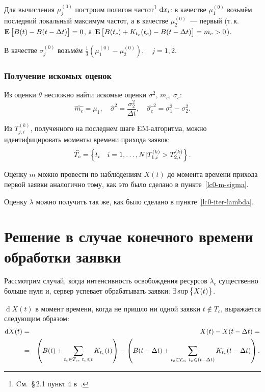 \documentclass[a4paper,10pt]{article}
\begin{document}
Для вычисления $\mu_j^{(0)}$ построим полигон частот\footnote{%
Cм.~\S\,2.1 пункт 4 в~\cite{ivchmed2010matstat}.
} $\dif x_i$:
в качестве $\mu_1^{(0)}$ возьмём последний локальный максимум частот, 
а в качестве $\mu_2^{(0)}$~--- первый
(т.\,к.~$\mathbf{E}\sbr{B(t) - B(t - \Delta t)} = 0$, 
а $\mathbf{E}\sbr{B(t_c) + K_{t_c}(t_c) - B(t - \Delta t)} = m_c > 0$).

В качестве $\sigma_j^{(0)}$ возьмём $\frac{1}{3}(\mu_1^{(0)} - \mu_2^{(0)}), 
\quad j=1, 2$.

\subsubsection{Получение искомых оценок}
Из оценки $\theta$ несложно найти искомые оценки 
$\sigma^2$, $m_c$, $\sigma_c$:
$$
  \widehat{m_c} = \mu_1, \quad 
  \widehat{\sigma}^2 = \frac{\sigma_2^2}{\Delta t}, \quad
  \widehat{\sigma_c}^2 = \sigma_1^2 - \sigma_2^2.
$$

Из $T_{j,i}^{(k)}$, полученного на последнем шаге EM-алгоритма, 
можно идентифицировать моменты времени прихода заявок:
$$\widehat{T_c} = \cbr{t_i \quad i=1,\ldots,N \vert 
    T_{1,i}^{(k)} > T_{2,i}^{(k)}}.$$

Оценку $m$ можно провести по наблюдениям $X(t)$ до момента времени прихода
первой заявки аналогично тому, как это было сделано в пункте~\ref{lc0-m-sigma}.

Оценку $\lambda$ можно получить так же, как было сделано 
в пункте~\ref{lc0-iter-lambda}.

\section{Решение в случае конечного времени обработки заявки}
Рассмотрим случай, когда интенсивность освобождения ресурсов $\lambda_c$ 
существенно больше нуля и,
сервер успевает обрабатывать заявки: $\exists \sup\cbr{X(t)}$.

$\operatorname{d}X(t)$ в момент времени, 
когда не пришло ни одной заявки $t \notin T_c$, 
выражается следующим образом:
\begin{eqnarray*}
\dif X(t) 
  & = & X(t) - X(t - \Delta t) = \\
  & = & \del{B(t) + \sum\limits_{t_c \in T_c,\ t_c \leqslant t} K_{t_c}(t)} - 
      \del{B(t - \Delta t) + 
        \sum\limits_{t_c \in T_c,\ t_c \leqslant (t - \Delta t)} 
          K_{t_c}(t - \Delta t)}.
\end{eqnarray*}
\end{document}
